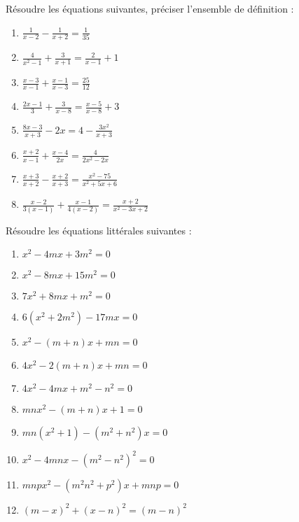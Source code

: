 \begin{exercice} 
Résoudre les équations suivantes, préciser l’ensemble de définition :
\begin{multicols}{2}
\begin{enumerate}
\item $\frac{1}{x-2}-\frac{1}{x+2}=\frac{1}{35}$ 
\item $\frac{4}{{{x}^{2}}-1}+\frac{3}{x+1}=\frac{2}{x-1}+1$ 
\item $\frac{x-3}{x-1}+\frac{x-1}{x-3}=\frac{25}{12}$ 
\item $\frac{2x-1}{3}+\frac{3}{x-8}=\frac{x-5}{x-8}+3$ 
\item $\frac{8x-3}{x+3}-2x=4-\frac{3{{x}^{2}}}{x+3}$
\item $\frac{x+2}{x-1}+\frac{x-4}{2x}=\frac{4}{2{{x}^{2}}-2x}$
\item $\frac{x+3}{x+2}-\frac{x+2}{x+3}=\frac{{{x}^{2}}-75}{{{x}^{2}}+5x+6}$
\item $\frac{x-2}{3\left( x-1 \right)}+\frac{x-1}{4\left( x-2 \right)}=\frac{x+2}{{{x}^{2}}-3x+2}$
\end{enumerate}
\end{multicols}
\end{exercice}

\begin{exercice}
Résoudre les équations littérales suivantes : 
\begin{multicols}{2}
\begin{enumerate}
\item ${{x}^{2}}-4mx+3{{m}^{2}}=0$ 
\item ${{x}^{2}}-8mx+15{{m}^{2}}=0$ 
\item $7{{x}^{2}}+8mx+{{m}^{2}}=0$
\item $6\left( {{x}^{2}}+2{{m}^{2}} \right)-17mx=0$ 
\item ${{x}^{2}}-\left( m+n \right)x+mn=0$ 
\item $4{{x}^{2}}-2\left( m+n \right)x+mn=0$ 
\item $4{{x}^{2}}-4mx+{{m}^{2}}-{{n}^{2}}=0$
\item $mn{{x}^{2}}-\left( m+n \right)x+1=0$
\item $mn\left( {{x}^{2}}+1 \right)-\left( {{m}^{2}}+{{n}^{2}} \right)x=0$
\item ${{x}^{2}}-4mnx-{{\left( {{m}^{2}}-{{n}^{2}} \right)}^{2}}=0$
\item $mnp{{x}^{2}}-\left( {{m}^{2}}{{n}^{2}}+{{p}^{2}} \right)x+mnp=0$
\item ${{\left( m-x \right)}^{2}}+{{\left( x-n \right)}^{2}}={{\left( m-n \right)}^{2}}$
\end{enumerate}
\end{multicols}
\end{exercice}

